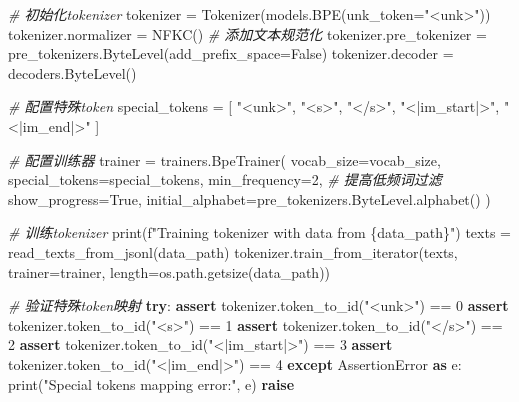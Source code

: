 \documentclass[
]{article}
\newenvironment{Shaded}{}{}
\newcommand{\BuiltInTok}[1]{\textcolor[rgb]{0.00,0.50,0.00}{#1}}
\newcommand{\CommentTok}[1]{\textcolor[rgb]{0.38,0.63,0.69}{\textit{#1}}}
\newcommand{\ControlFlowTok}[1]{\textcolor[rgb]{0.00,0.44,0.13}{\textbf{#1}}}
\newcommand{\DecValTok}[1]{\textcolor[rgb]{0.25,0.63,0.44}{#1}}
\newcommand{\ImportTok}[1]{\textcolor[rgb]{0.00,0.50,0.00}{\textbf{#1}}}
\newcommand{\NormalTok}[1]{#1}
\newcommand{\OperatorTok}[1]{\textcolor[rgb]{0.40,0.40,0.40}{#1}}
\newcommand{\PreprocessorTok}[1]{\textcolor[rgb]{0.74,0.48,0.00}{#1}}
\newcommand{\SpecialCharTok}[1]{\textcolor[rgb]{0.25,0.44,0.63}{#1}}
\newcommand{\SpecialStringTok}[1]{\textcolor[rgb]{0.73,0.40,0.53}{#1}}
\newcommand{\StringTok}[1]{\textcolor[rgb]{0.25,0.44,0.63}{#1}}
\newcommand{\VariableTok}[1]{\textcolor[rgb]{0.10,0.09,0.49}{#1}}
\begin{document}
\begin{Shaded}
\begin{Highlighting}[]
    \CommentTok{\# 初始化tokenizer}
\NormalTok{    tokenizer }\OperatorTok{=}\NormalTok{ Tokenizer(models.BPE(unk\_token}\OperatorTok{=}\StringTok{"\textless{}unk\textgreater{}"}\NormalTok{))}
\NormalTok{    tokenizer.normalizer }\OperatorTok{=}\NormalTok{ NFKC()  }\CommentTok{\# 添加文本规范化}
\NormalTok{    tokenizer.pre\_tokenizer }\OperatorTok{=}\NormalTok{ pre\_tokenizers.ByteLevel(add\_prefix\_space}\OperatorTok{=}\VariableTok{False}\NormalTok{)}
\NormalTok{    tokenizer.decoder }\OperatorTok{=}\NormalTok{ decoders.ByteLevel()}

    \CommentTok{\# 配置特殊token}
\NormalTok{    special\_tokens }\OperatorTok{=}\NormalTok{ [}
        \StringTok{"\textless{}unk\textgreater{}"}\NormalTok{, }
        \StringTok{"\textless{}s\textgreater{}"}\NormalTok{, }
        \StringTok{"\textless{}/s\textgreater{}"}\NormalTok{, }
        \StringTok{"\textless{}|im\_start|\textgreater{}"}\NormalTok{, }
        \StringTok{"\textless{}|im\_end|\textgreater{}"}
\NormalTok{    ]}

    \CommentTok{\# 配置训练器}
\NormalTok{    trainer }\OperatorTok{=}\NormalTok{ trainers.BpeTrainer(}
\NormalTok{        vocab\_size}\OperatorTok{=}\NormalTok{vocab\_size,}
\NormalTok{        special\_tokens}\OperatorTok{=}\NormalTok{special\_tokens,}
\NormalTok{        min\_frequency}\OperatorTok{=}\DecValTok{2}\NormalTok{,  }\CommentTok{\# 提高低频词过滤}
\NormalTok{        show\_progress}\OperatorTok{=}\VariableTok{True}\NormalTok{,}
\NormalTok{        initial\_alphabet}\OperatorTok{=}\NormalTok{pre\_tokenizers.ByteLevel.alphabet()}
\NormalTok{    )}

    \CommentTok{\# 训练tokenizer}
    \BuiltInTok{print}\NormalTok{(}\SpecialStringTok{f"Training tokenizer with data from }\SpecialCharTok{\{}\NormalTok{data\_path}\SpecialCharTok{\}}\SpecialStringTok{"}\NormalTok{)}
\NormalTok{    texts }\OperatorTok{=}\NormalTok{ read\_texts\_from\_jsonl(data\_path)}
\NormalTok{    tokenizer.train\_from\_iterator(texts, trainer}\OperatorTok{=}\NormalTok{trainer, length}\OperatorTok{=}\NormalTok{os.path.getsize(data\_path))}

    \CommentTok{\# 验证特殊token映射}
    \ControlFlowTok{try}\NormalTok{:}
        \ControlFlowTok{assert}\NormalTok{ tokenizer.token\_to\_id(}\StringTok{"\textless{}unk\textgreater{}"}\NormalTok{) }\OperatorTok{==} \DecValTok{0}
        \ControlFlowTok{assert}\NormalTok{ tokenizer.token\_to\_id(}\StringTok{"\textless{}s\textgreater{}"}\NormalTok{) }\OperatorTok{==} \DecValTok{1}
        \ControlFlowTok{assert}\NormalTok{ tokenizer.token\_to\_id(}\StringTok{"\textless{}/s\textgreater{}"}\NormalTok{) }\OperatorTok{==} \DecValTok{2}
        \ControlFlowTok{assert}\NormalTok{ tokenizer.token\_to\_id(}\StringTok{"\textless{}|im\_start|\textgreater{}"}\NormalTok{) }\OperatorTok{==} \DecValTok{3}
        \ControlFlowTok{assert}\NormalTok{ tokenizer.token\_to\_id(}\StringTok{"\textless{}|im\_end|\textgreater{}"}\NormalTok{) }\OperatorTok{==} \DecValTok{4}
    \ControlFlowTok{except} \PreprocessorTok{AssertionError} \ImportTok{as}\NormalTok{ e:}
        \BuiltInTok{print}\NormalTok{(}\StringTok{"Special tokens mapping error:"}\NormalTok{, e)}
        \ControlFlowTok{raise}


\end{Highlighting}
\end{Shaded}
\end{document}
